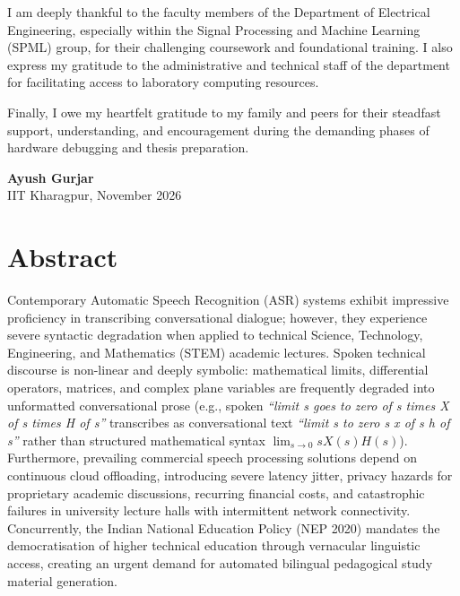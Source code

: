 \documentclass[11pt,a4paper,oneside]{report}
\begin{document}
I am deeply thankful to the faculty members of the Department of Electrical Engineering, especially within the Signal Processing and Machine Learning (SPML) group, for their challenging coursework and foundational training. I also express my gratitude to the administrative and technical staff of the department for facilitating access to laboratory computing resources.

Finally, I owe my heartfelt gratitude to my family and peers for their steadfast support, understanding, and encouragement during the demanding phases of hardware debugging and thesis preparation.

\vspace{1.5cm}
\noindent
\textbf{Ayush Gurjar}\\
IIT Kharagpur, November 2026

\clearpage

\chapter*{Abstract}

Contemporary Automatic Speech Recognition (ASR) systems exhibit impressive proficiency in transcribing conversational dialogue; however, they experience severe syntactic degradation when applied to technical Science, Technology, Engineering, and Mathematics (STEM) academic lectures. Spoken technical discourse is non-linear and deeply symbolic: mathematical limits, differential operators, matrices, and complex plane variables are frequently degraded into unformatted conversational prose (e.g., spoken \textit{``limit s goes to zero of s times X of s times H of s''} transcribes as conversational text \textit{``limit s to zero s x of s h of s''} rather than structured mathematical syntax $\lim_{s \to 0} s X(s) H(s)$). Furthermore, prevailing commercial speech processing solutions depend on continuous cloud offloading, introducing severe latency jitter, privacy hazards for proprietary academic discussions, recurring financial costs, and catastrophic failures in university lecture halls with intermittent network connectivity. Concurrently, the Indian National Education Policy (NEP 2020) mandates the democratisation of higher technical education through vernacular linguistic access, creating an urgent demand for automated bilingual pedagogical study material generation.
\end{document}
